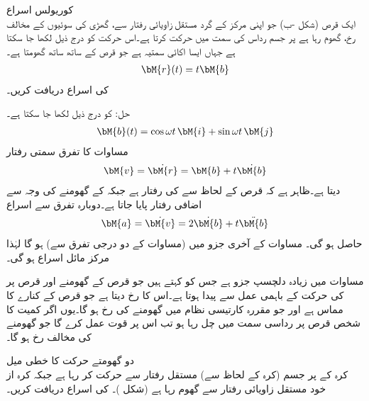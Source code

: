 \quad کوریولس اسراع\\ 
ایک قرص (شکل -ب) جو اپنی مرکز کے گرد مستقل زاویائی رفتار  سے، گھڑی کی سوئیوں کے مخالف رخ، گھوم رہا ہے پر جسم   رداس کی سمت میں حرکت کرتا ہے۔اس حرکت کو درج ذیل لکھا جا سکتا ہے جہاں  ایسا اکائی سمتیہ ہے جو قرص کے ساتھ ساتھ گھومتا ہے۔
\begin{align}\label{مساوات_الاحصاء_مثال_کوریولس_الف}
\bM{r}(t)=t\bM{b}
\end{align}
 کی اسراع دریافت کریں۔

حل: کو درج ذیل لکھا جا سکتا ہے۔
\begin{align}\label{مساوات_الاحصاء_مثال_کوریولس_ب}
\bM{b}(t)=\cos \omega t \,\bM{i}+\sin \omega t \, \bM{j}
\end{align}
مساوات  کا تفرق سمتی رفتار
\begin{align}\label{مساوات_الاحصاء_مثال_کوریولس_پ}
\bM{v}=\dot{\bM{r}}=\bM{b}+t\dot{\bM{b}}
\end{align}
دیتا ہے۔ظاہر ہے کہ قرص کے لحاظ سے  کی رفتار  ہے جبکہ  کے گھومنے کی وجہ سے اضافی رفتار  پایا جاتا ہے۔دوبارہ تفرق سے اسراع 
\begin{align}\label{مساوات_الاحصاء_مثال_کوریولس_ت}
\bM{a}=\dot{\bM{v}}=2\dot{\bM{b}}+t\ddot{\bM{b}}
\end{align}
حاصل ہو گی۔ مساوات  کے آخری جزو میں (مساوات   کے دو درجی تفرق سے)   ہو گا لہٰذا  مرکز مائل اسراع ہو گی۔

 مساوات  میں زیادہ دلچسپ جزو  ہے جس کو  کہتے ہیں  جو قرص کے گھومنے  اور قرص پر  کی حرکت  کے باہمی عمل سے پیدا ہوتا ہے۔اس کا رخ  دیتا ہے جو قرص کے کنارے کا مماس ہے اور جو  مقررہ  کارتیسی نظام میں گھومنے کی رخ ہو گا۔یوں اگر کمیت   کا شخص قرص پر رداسی سمت میں چل رہا ہو تب اس پر قوت  عمل کرے گا جو گھومنے کی مخالف رخ ہو گا۔ 

\quad دو گھومتے حرکت کا خطی میل\\
کرہ کے   پر جسم   (کرہ کے لحاظ سے) مستقل رفتار سے حرکت کر رہا ہے جبکہ کرہ از خود مستقل زاویائی رفتار   سے گھوم رہا ہے (شکل )۔  کی اسراع دریافت کریں۔

